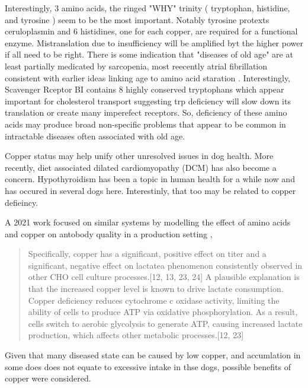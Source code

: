 \documentclass[aps,secnumarabic,balancelastpage,amsmath,amssymb,nofootinbib]{revtex4}
\begin{document}
Interestingly, 3 amino acids, the ringed "WHY" trinity
( tryptophan, histidine, and tyrosine ) seem to be
the most important. Notably tyrosine protexts ceruloplasmin
and 6 histidines, one for each copper, are required for
a functional enzyme. Mistranslation due to insufficiency
will be amplified byt the higher power if all need to be right. 
There is some indication that "diseases of old age" 
are at least partially medicated by sarcopenia,
most reecently atrial fibrillation
\cite{PMID38739369}
consistent with earlier ideas linking age to
amino acid staration
\cite{mmarchywka-MJM-2021-007-.1-table-rg}
.
Interestingly, Scavenger Rceptor BI contains 8 highly
conserved tryptophans
\cite{Holme_Miller_Nicholson_Tryptophan_Critical_2016}
which appear important for cholesterol transport
suggesting trp deficiency will slow down its translation
or create many imperefect receptors. 
So, deficiency of these amino acids may produce broad 
non-specific problems that appear to be common
in intractable diseases often associated with old age. 

Copper status may help unify other unresolved issues
in dog health. 
More recently, diet associated dilated cardiomyopathy (DCM)
has also become a concern.
Hypothyroidism has been a topic in human health for a while
now and has occured in several dogs here. Interestinly,
that too may be related to copper defieincy.


A 2021 work focused on similar systems by modelling the
effect of amino acids and copper on antobody quality in 
a production setting 
\cite{PMID32875683},
\begin{quote}
{Specifically, copper has a significant, positive effect on titer and a
significant, negative effect on lactatea phenomenon consistently observed
in other CHO cell culture processes.{[}12, 13, 23, 24{]} A plausible explanation
is that the increased copper level is known to drive lactate consumption.
Copper deficiency reduces cytochrome c oxidase activity, limiting the ability
of cells to produce ATP via oxidative phosphorylation. As a result, cells
switch to aerobic glycolysis to generate ATP, causing increased lactate
production, which affects other metabolic processes.{[}12, 23{]}}
\end{quote}


Given that many diseased state can be caused by low copper,
and accumlation in some does does not equate to excessive
intake in thse dogs, possible benefits of copper were considered.
\end{document}
